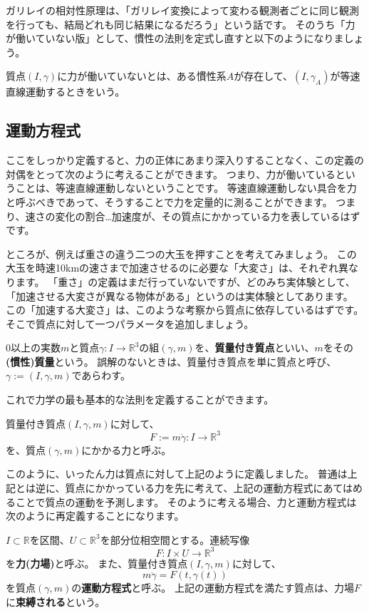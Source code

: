 ガリレイの相対性原理は、「ガリレイ変換によって変わる観測者ごとに同じ観測を行っても、結局どれも同じ結果になるだろう」という話です。
そのうち「力が働いていない版」として、慣性の法則を定式し直すと以下のようになりましょう。
\begin{definition}
  質点$(I,\gamma)$に力が働いていないとは、ある慣性系$A$が存在して、$(I,\gamma_A)$が等速直線運動するときをいう。
\end{definition}



\subsection{運動方程式}

ここをしっかり定義すると、力の正体にあまり深入りすることなく、この定義の対偶をとって次のように考えることができます。
つまり、力が働いているということは、等速直線運動しないということです。
等速直線運動しない具合を力と呼ぶべきであって、そうすることで力を定量的に測ることができます。
つまり、速さの変化の割合…加速度が、その質点にかかっている力を表しているはずです。

ところが、例えば重さの違う二つの大玉を押すことを考えてみましょう。
この大玉を時速10kmの速さまで加速させるのに必要な「大変さ」は、それぞれ異なります。
「重さ」の定義はまだ行っていないですが、どのみち実体験として、「加速させる大変さが異なる物体がある」というのは実体験としてあります。
この「加速する大変さ」は、このような考察から質点に依存しているはずです。
そこで質点に対して一つパラメータを追加しましょう。

\begin{definition}[慣性質量]
  0以上の実数$m$と質点$\gamma:I\to\mathbb{R}^3$の組$(\gamma,m)$を、\textbf{質量付き質点}といい、$m$をその\textbf{(慣性)質量}という。
  誤解のないときは、質量付き質点を単に質点と呼び、$\gamma:=(I,\gamma,m)$であらわす。
\end{definition}

これで力学の最も基本的な法則を定義することができます。
\begin{definition}[運動方程式]
  質量付き質点$(I,\gamma,m)$に対して、
  \[
    F:=m\ddot\gamma:I\to\mathbb{R}^3
  \]
  を、質点$(\gamma,m)$にかかる力と呼ぶ。
\end{definition}

このように、いったん力は質点に対して上記のように定義しました。
普通は上記とは逆に、質点にかかっている力を先に考えて、上記の運動方程式にあてはめることで質点の運動を予測します。
そのように考える場合、力と運動方程式は次のように再定義することになります。
\begin{definition}[運動方程式]
  $I\subset\mathbb{R}$を区間、$U\subset\mathbb{R}^3$を部分位相空間とする。連続写像
  \[
    F:I\times U\to\mathbb{R}^3
  \]
  を\textbf{力(力場)}と呼ぶ。
  また、質量付き質点$(I,\gamma,m)$に対して、
  \[
    m\ddot\gamma=F(t,\gamma(t))
  \]
  を質点$(\gamma,m)$の\textbf{運動方程式}と呼ぶ。
  上記の運動方程式を満たす質点は、力場$F$に\textbf{束縛される}という。
\end{definition}

